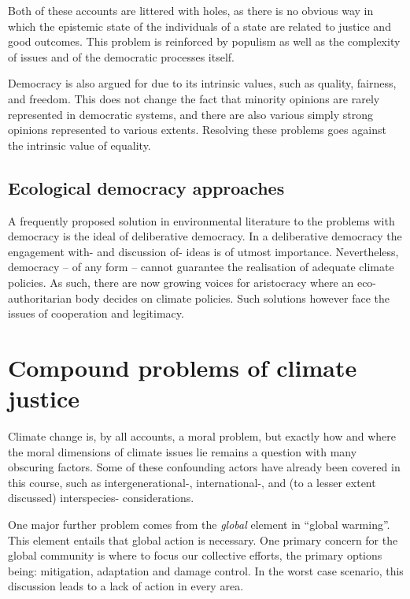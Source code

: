 \documentclass[12pt]{report}
\begin{document}
Both of these accounts are littered with holes, as there is no obvious way in
which the epistemic state of the individuals of a state are related to justice
and good outcomes. This problem is reinforced by populism as well as the
complexity of issues and of the democratic processes itself. 

Democracy is also argued for due to its intrinsic values, such as quality,
fairness, and freedom. This does not change the fact that minority opinions are
rarely represented in democratic systems, and there are also various simply
strong opinions represented to various extents. Resolving these problems goes
against the intrinsic value of equality.


\section{Ecological democracy approaches}

A frequently proposed solution in environmental literature to the problems with
democracy is the ideal of deliberative democracy. In a deliberative democracy
the engagement with- and discussion of- ideas is of utmost importance.
Nevertheless, democracy -- of any form -- cannot guarantee the realisation of
adequate climate policies. As such, there are now growing voices for aristocracy
where an eco-authoritarian body decides on climate policies. Such solutions
however face the issues of cooperation and legitimacy.

\chapter{Compound problems of climate justice}

Climate change is, by all accounts, a moral problem, but exactly how and where
the moral dimensions of climate issues lie remains a question with many
obscuring factors. Some of these confounding actors have already been covered in
this course, such as intergenerational-, international-, and (to a lesser extent
discussed) interspecies- considerations.

One major further problem comes from the \emph{global} element in ``global
warming''. This element entails that global action is necessary. One primary
concern for the global community is where to focus our collective efforts, the
primary options being: mitigation, adaptation and damage control. In the worst
case scenario, this discussion leads to a lack of action in every area.
\end{document}
